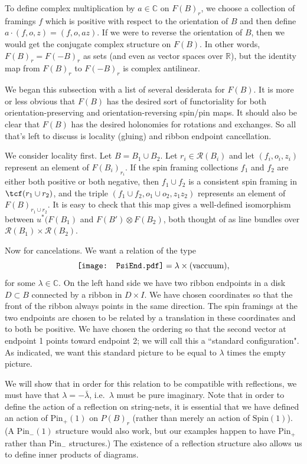 \documentclass[12pt,a4paper]{article}
\newcommand{\cc}{\mathbb{C}}
\newcommand{\rr}{\mathbb{R}}
\newcommand{\mcr}{\mathcal{R}}
\newcommand\be            {\begin{equation}}
\newcommand\ee            {\end{equation}}
\newcommand{\spin}{\text{Spin}}
\newcommand{\pin}{\text{Pin}}	%
\newcommand{\PsiEnd}{\mathord{\vcenter{\hbox{\texttt{[image: PsiEnd.pdf]}}}}}
\begin{document}
To define complex multiplication by $a\in\cc$ on $F(B)_r$, we choose a collection of framings $f$ which is positive
with respect to the orientation of $B$ and then define $a\cdot (f, o, z) = (f, o, az)$.
If we were to reverse the orientation of $B$, then we would get the conjugate complex structure on $F(B)$.
In other words, $F(B)_r = F(-B)_r$ as sets (and even as vector spaces over $\rr$), but the identity map from
$F(B)_r$ to $F(-B)_r$ is complex antilinear.

\medskip

We began this subsection with a list of several desiderata for $F(B)$.
It is more or less obvious that $F(B)$ has the desired sort of functoriality for both orientation-preserving
and orientation-reversing spin/pin maps.
It should also be clear that $F(B)$ has the desired holonomies for rotations and exchanges.
So all that's left to discuss is locality (gluing) and ribbon endpoint cancellation.

\medskip

We consider locality first.
Let $B = B_1 \cup B_2$.
Let $r_i \in \mcr(B_i)$ and let $(f_i, o_i, z_i)$ represent an element of $F(B_i)_{r_i}$.
If the spin framing collections $f_1$ and $f_2$ are either both positive or both negative, then
$f_1 \cup f_2$ is a consistent spin framing in $\tcf(r_1 \cup r_2)$, and the triple
$(f_1 \cup f_2, o_1\cup o_2, z_1 z_2)$ represents an element of $F(B)_{r_1\cup r_2}$.
It is easy to check that this map gives a well-defined  isomorphism between $u^*(F(B_1)$ 
and $F(B')\otimes F(B_2)$, both thought of as line bundles over $\mcr(B_1)\times\mcr(B_2)$.

\medskip

Now for cancelations.
We want a relation of the type 
\be \label{eval_psi_semicirc}
\PsiEnd  = \lambda \times \text{(vaccuum)},
 \ee
for some $\lambda \in \cc$. 
On the left hand side we have two ribbon endpoints in a disk $D \subset B$ connected by a ribbon in $D\times I$.
We have chosen coordinates so that the front of the ribbon always points in the same direction.
The spin framings at the two endpoints are chosen to be related by a translation in these coordinates
and to both be positive.
We have chosen the ordering so that the second vector at endpoint 1 points toward endpoint 2;
we will call this a ``standard configuration".
As indicated, we want this standard picture to be equal to $\lambda$ times the empty picture.

We will show that in order for this relation to be compatible with reflections, 
we must have that $\lambda = -\bar\lambda$, i.e.\ $\lambda$ must be pure imaginary.
Note that in order to define the action of a reflection on string-nets, it is essential that we have defined an 
action of $\pin_+(1)$ on $P(B)_r$ (rather than merely an action of $\spin(1)$). 
(A $\pin_-(1)$ structure would also work, but our examples happen to have $\pin_+$ rather than $\pin_-$ structures.)
The existence of a reflection structure also allows us to define inner products of diagrams. 
\end{document}
